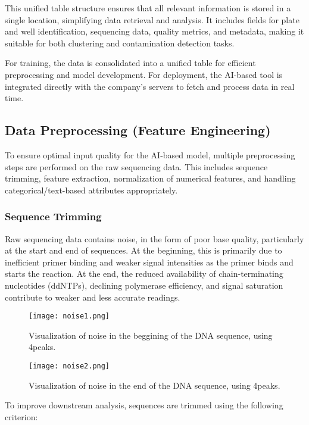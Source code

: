 This unified table structure ensures that all relevant information is stored in a single location, simplifying data retrieval and analysis. It includes fields for plate and well identification, sequencing data, quality metrics, and metadata, making it suitable for both clustering and contamination detection tasks.

For training, the data is consolidated into a unified table for efficient preprocessing and model development. For deployment, the AI-based tool is integrated directly with the company's servers to fetch and process data in real time.

\subsection{Data Preprocessing (Feature Engineering)}

To ensure optimal input quality for the AI-based model, multiple preprocessing steps are performed on the raw sequencing data. This includes sequence trimming, feature extraction, normalization of numerical features, and handling categorical/text-based attributes appropriately.

\subsubsection{Sequence Trimming}
Raw sequencing data contains noise, in the form of poor base quality, particularly at the start and end of sequences. At the beginning, this is primarily due to inefficient primer binding and weaker signal intensities as the primer binds and starts the reaction. At the end, the reduced availability of chain-terminating nucleotides (ddNTPs), declining polymerase efficiency, and signal saturation contribute to weaker and less accurate readings. \cite{sanger_method_original}

\begin{figure}[h]
  \centering
  \texttt{[image: noise1.png]}
  \caption{Visualization of noise in the beggining of the DNA sequence, using 4peaks.}
  \label{fig:noise1}
\end{figure}

\begin{figure}[h]
  \centering
  \texttt{[image: noise2.png]}
  \caption{Visualization of noise in the end of the DNA sequence, using 4peaks.}
  \label{fig:noise2}
\end{figure}

To improve downstream analysis, sequences are trimmed using the following criterion:

